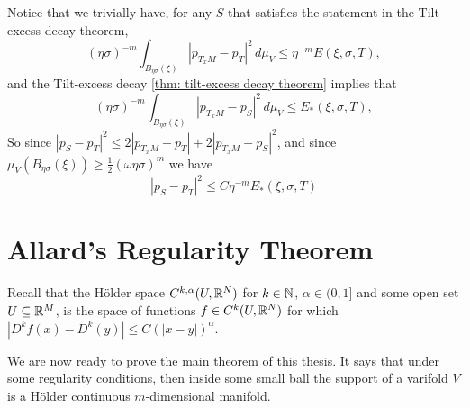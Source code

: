 Notice that we trivially have, for any $S$ that satisfies the statement in the Tilt-excess decay theorem, 
\[
    (\eta\sigma)^{-m} \int_{B_{\eta\sigma}(\xi)}|p_{T_xM} - p_T|^2\, d\mu_V \le \eta^{-m}E(\xi, \sigma, T),
\]
and the Tilt-excess decay \cref{thm: tilt-excess decay theorem} implies that
\[
    (\eta\sigma)^{-m} \int_{B_{\eta\sigma}(\xi)}|p_{T_xM} - p_S|^2\, d\mu_V \le E_*(\xi, \sigma, T),
\]
So since $|p_S-p_T|^2 \le 2|p_{T_xM}-p_T| + 2|p_{T_xM} - p_S|^2$, and since $\mu_V(B_{\eta\sigma}(\xi))\ge \frac{1}{2}(\omega\eta\sigma)^m$ we have
\begin{equation}
    |p_S-p_T|^2 \le C \eta^{-m} E_*(\xi, \sigma, T) \label{eq: remark 4.6}
\end{equation}


\section{Allard's Regularity Theorem}
Recall that the Hölder space $C^{k,\alpha}(U,\mathbb{R}^N)$ for $k \in \mathbb{N}$, $\alpha \in (0,1]$ and some open set $U \subseteq \mathbb{R}^M$, is the space of functions $f \in C^k(U, \mathbb{R}^N)$ for which $|D^kf(x)-D^k(y)| \le C(|x-y|)^{\alpha}$.

We are now ready to prove the main theorem of this thesis. It says that under some regularity conditions, then inside some small ball the support of a varifold $V$ is a Hölder continuous $m$-dimensional manifold.


